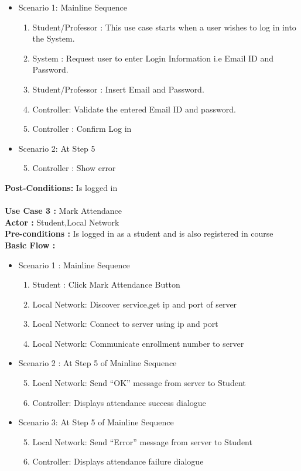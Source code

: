 \documentclass{article}
\begin{document}
\begin{itemize}
    \item Scenario 1: Mainline Sequence
\begin{enumerate}
\item Student/Professor : This use case starts when a user wishes to log in into the System. 
\item System : Request user to enter Login Information i.e Email ID and Password. 
\item Student/Professor : Insert Email and Password. 	
\item Controller: Validate the entered Email ID and password.
\item Controller : Confirm Log in
\end{enumerate}
	\item Scenario 2: At Step 5
	    \begin{enumerate}
	        \setcounter{enumi}{4}
		    \item Controller : Show error
	    \end{enumerate}
		
\end{itemize}
\textbf{Post-Conditions:} Is logged in\\ \\
\textbf{Use Case 3 :} Mark Attendance \\
\textbf{Actor :} Student,Local Network\\
\textbf{Pre-conditions :}  Is logged in as a student and is also registered in course\\
\textbf{Basic Flow :}
\begin{itemize}
    \item Scenario 1 : Mainline Sequence
        \begin{enumerate}
            \item Student : Click Mark Attendance Button
	\item Local Network: Discover service,get ip and port of server
	\item Local Network: Connect to server using ip and port
	\item Local Network: Communicate enrollment number to server
        \end{enumerate}
   \item Scenario 2 : At Step 5 of Mainline Sequence
        \begin{enumerate}
	\setcounter{enumi}{4}
            \item Local Network: Send “OK” message from server to Student
	        \item Controller: Displays attendance success dialogue
        \end{enumerate}
 \item Scenario 3: At Step 5 of Mainline Sequence
       \begin{enumerate}
	\setcounter{enumi}{4}
	\item Local Network: Send “Error” message from server to Student
	\item Controller: Displays attendance failure dialogue
     \end{enumerate}
\end{itemize}
\end{document}
